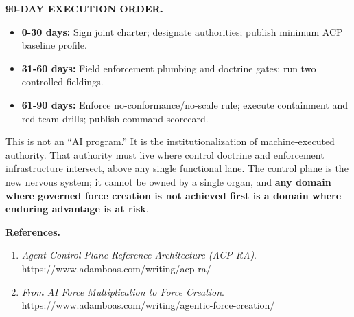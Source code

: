 \documentclass[11pt]{article}
\begin{document}
\textbf{90-DAY EXECUTION ORDER.}

\begin{itemize}
\tightlist
\item
  \textbf{0-30 days:} Sign joint charter; designate authorities; publish
  minimum ACP baseline profile.
\item
  \textbf{31-60 days:} Field enforcement plumbing and doctrine gates;
  run two controlled fieldings.
\item
  \textbf{61-90 days:} Enforce no-conformance/no-scale rule; execute
  containment and red-team drills; publish command scorecard.
\end{itemize}

This is not an ``AI program.'' It is the institutionalization of
machine-executed authority. That authority must live where control
doctrine and enforcement infrastructure intersect, above any single
functional lane. The control plane is the new nervous system; it cannot
be owned by a single organ, and \textbf{any domain where governed force
creation is not achieved first is a domain where enduring advantage is
at risk}.

\textbf{References.}

\begin{enumerate}
\def\labelenumi{\arabic{enumi}.}
\tightlist
\item
  \emph{Agent Control Plane Reference Architecture (ACP-RA)}.
  https://www.adamboas.com/writing/acp-ra/
\item
  \emph{From AI Force Multiplication to Force Creation}.
  https://www.adamboas.com/writing/agentic-force-creation/
\end{enumerate}
\end{document}
